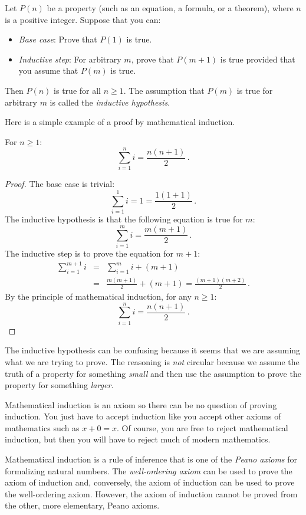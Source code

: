 \begin{axiom}
Let $P(n)$ be a property (such as an equation, a formula, or a theorem), where $n$ is a positive integer. Suppose that you can:
\begin{itemize}
\item \emph{Base case}: Prove that $P(1)$ is true.
\item \emph{Inductive step}: For arbitrary $m$, prove that $P(m+1)$ is true provided that you assume that $P(m)$ is true.
\end{itemize}
Then $P(n)$ is true for all $n\geq 1$.
The assumption that $P(m)$ is true for arbitrary $m$ is called the \emph{inductive hypothesis}.
\end{axiom}
Here is a simple example of a proof by mathematical induction.
\begin{theorem}\label{t.sum}
For $n\geq 1$:
\[
\sum_{i=1}^n i = \frac{n(n+1)}{2}\,.
\]
\end{theorem}

\begin{proof} The base case is trivial:
\[
\sum_{i=1}^1 i = 1 =\frac{1(1+1)}{2}\,.
\]
The inductive hypothesis is that the following equation is true for $m$:
\[
\sum_{i=1}^{m} i = \frac{m(m+1)}{2}\,.
\]
The inductive step is to prove the equation for $m+1$:
\begin{eqnarray*}
\sum_{i=1}^{m+1} i &=& \sum_{i=1}^m i + (m+1)\label{l.sum1}\\
&=&\frac{m(m+1)}{2} + (m+1)\label{l.sum2}
=\frac{(m+1)(m+2)}{2}\,.\label{l.sum4}
\end{eqnarray*}
By the principle of mathematical induction, for any $n\geq 1$:
\[
\sum_{i=1}^n i = \frac{n(n+1)}{2}\,.
\]
\end{proof}

The inductive hypothesis can be confusing because it seems that we are assuming what we are trying to prove. The reasoning is \emph{not} circular because we assume the truth of a property for something \emph{small} and then use the assumption to prove the property for something \emph{larger}.

Mathematical induction is an axiom so there can be no question of proving induction. You just have to accept induction like you accept other axioms of mathematics such as $x+0=x$. Of course, you are free to reject mathematical induction, but then you will have to reject much of modern mathematics.
\begin{advanced}
Mathematical induction is a rule of inference that is one of the \emph{Peano axioms} for formalizing natural numbers. The \emph{well-ordering axiom} can be used to prove the axiom of induction and, conversely, the axiom of induction can be used to prove the well-ordering axiom. However, the axiom of induction cannot be proved from the other, more elementary, Peano axioms.
\end{advanced}


